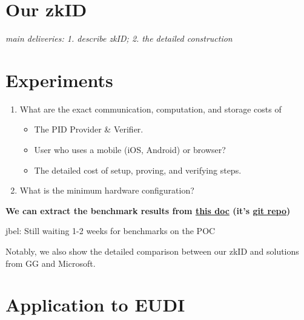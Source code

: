 \documentclass{iacrtrans}
\newcommand{\jbel}[1]{{\color{blue}{}jbel: #1}}
\begin{document}
\section{Our zkID}
\label{sec:contribution}
\textit{main deliveries: 1. describe zkID; 2. the detailed construction}



\section{Experiments}
\label{sec:experiments}
\begin{enumerate}
    \item What are the exact communication, computation, and storage costs of \begin{itemize}
        \item The PID Provider \& Verifier.
        \item User who uses a mobile (iOS, Android) or browser?
        \item The detailed cost of setup, proving, and verifying steps.
    \end{itemize}
    \item What is the minimum hardware configuration? 
\end{enumerate}

\textbf{We can extract the benchmark results from \href{https://hackmd.io/@clientsideproving/zkIDBenchmarks}{this doc} (it's \href{https://github.com/privacy-scaling-explorations/zkid-benchmarks}{git repo}) }

\jbel{Still waiting 1-2 weeks for benchmarks on the POC}

Notably, we also show the detailed comparison between our zkID and solutions from GG and Microsoft.


\section{Application to EUDI}
\label{sec:appeudi}

\end{document}
